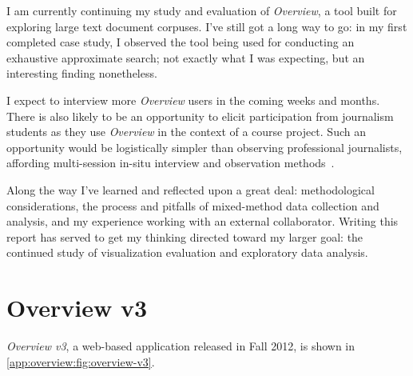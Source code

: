 I am currently continuing my study and evaluation of {\it Overview}, a tool built for exploring large text document corpuses. 
I've still got a long way to go: in my first completed case study, I observed the tool being used for conducting an exhaustive approximate search; not exactly what I was expecting, but an interesting finding nonetheless. 

I expect to interview more {\it Overview} users in the coming weeks and months.
There is also likely to be an opportunity to elicit participation from journalism students as they use {\it Overview} in the context of a course project. 
Such an opportunity would be logistically simpler than observing professional journalists, affording multi-session in-situ interview and observation methods~\cite{Chang2010,Saraiya2005b}.

Along the way I've learned and reflected upon a great deal: methodological considerations, the process and pitfalls of mixed-method data collection and analysis, and my experience working with an external collaborator. 
Writing this report has served to get my thinking directed toward my larger goal: the continued study of visualization evaluation and exploratory data analysis.


\section{Overview v3}
\label{app:overview:v3}


\textsl{Overview v3}, a web-based application released in Fall 2012, is shown in \autoref{app:overview:fig:overview-v3}.


